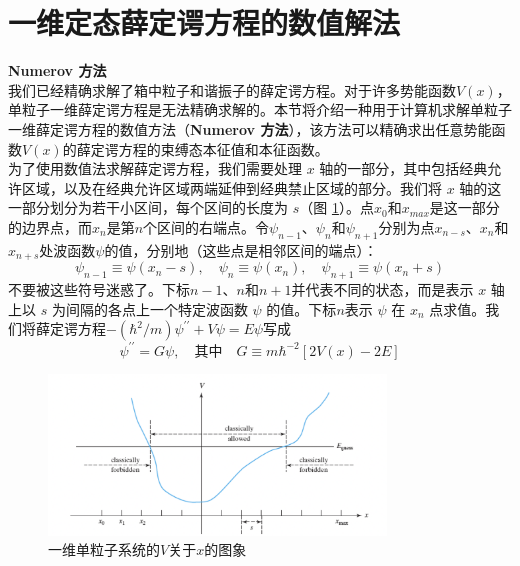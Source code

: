 \section{一维定态薛定谔方程的数值解法}
\label{sec:4.4 Numerical Solutions of the One-Dimensional Time-Independent Schrödinger Equation}
\noindent\textbf{Numerov 方法}\\
    \indent 我们已经精确求解了箱中粒子和谐振子的薛定谔方程。对于许多势能函数$V\left(x\right)$，单粒子一维薛定谔方程是无法精确求解的。本节将介绍一种用于计算机求解单粒子一维薛定谔方程的数值方法（\textbf{Numerov 方法}），该方法可以精确求出任意势能函数$V\left(x\right)$的薛定谔方程的束缚态本征值和本征函数。\\
    \indent 为了使用数值法求解薛定谔方程，我们需要处理 $x$ 轴的一部分，其中包括经典允许区域，以及在经典允许区域两端延伸到经典禁止区域的部分。我们将 $x$ 轴的这一部分划分为若干小区间，每个区间的长度为 $s$（图 \ref{fig:4.7}）。点$x_0$和$x_{max}$是这一部分的边界点，而$x_n$是第$n$个区间的右端点。令$\psi_{n-1}$、$\psi_n$和$\psi_{n+1}$分别为点$x_{n-s}$、$x_n$和$x_{n+s}$处波函数$\psi$的值，分别地（这些点是相邻区间的端点）：
    \begin{equation}
        \psi_{n-1} \equiv \psi\left(x_n-s\right), \quad \psi_n \equiv \psi\left(x_n\right), \quad \psi_{n+1} \equiv \psi\left(x_n+s\right)
        \label{eq:4.65}
    \end{equation}
    不要被这些符号迷惑了。下标$n-1$、$n$和$n+1$并代表不同的状态，而是表示 $x$ 轴上以 $s$ 为间隔的各点上一个特定波函数 $\psi$ 的值。下标$n$表示 $\psi$ 在 $x_n$ 点求值。我们将薛定谔方程$-\left(\hbar^2/m\right)\psi^{\prime\prime} + V\psi = E\psi$写成
    \begin{equation}
        \psi^{\prime\prime} = G\psi, \quad \text{其中} \quad G \equiv m\hbar^{-2}\left[2V\left(x\right)-2E\right]
        \label{eq:4.66}
    \end{equation}
    \begin{figure}[h!]
        \centering
        \includegraphics[width=0.8\textwidth]{figures/4.7.png}
        \caption{一维单粒子系统的$V$关于$x$的图象}
        \label{fig:4.7}
    \end{figure}
